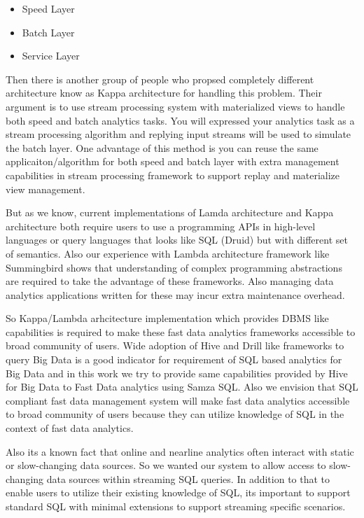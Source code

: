 \documentclass[10pt, conference, compsocconf]{IEEEtran}
\begin{document}
\begin{itemize}
 \item Speed Layer
 \item Batch Layer
 \item Service Layer
\end{itemize}

Then there is another group of people who propsed completely different architecture know as Kappa architecture for handling this problem. Their argument is to use stream processing system with materialized views to handle both speed and batch analytics tasks. You will expressed your analytics task as a stream processing algorithm and replying input streams will be used to simulate the batch layer. One advantage of this method is you can reuse the same applicaiton/algorithm for both speed and batch layer with extra management capabilities in stream processing framework to support replay and materialize view management.

But as we know, current implementations of Lamda architecture and Kappa architecture both require users to use a programming APIs in high-level languages or query languages that looks like SQL (Druid) but with different set of semantics. Also our experience with Lambda architecture framework like Summingbird shows that understanding of complex programming abstractions are required to take the advantage of these frameworks. Also managing data analytics applications written for these may incur extra maintenance overhead. 

So Kappa/Lambda arhcitecture implementation which provides DBMS like capabilities is required to make these fast data analytics frameworks accessible to broad community of users. Wide adoption of Hive and Drill like frameworks to query Big Data is a good indicator for requirement of SQL based analytics for Big Data and in this work we try to provide same capabilities provided by Hive for Big Data to Fast Data analytics using Samza SQL. Also we envision that SQL compliant fast data management system will make fast data analytics accessible to broad community of users because they can utilize knowledge of SQL in the context of fast data analytics. 

Also its a known fact that online and nearline analytics often interact with static or slow-changing data sources. So we wanted our system to allow access to slow-changing data sources within streaming SQL queries. In addition to that to enable users to utilize their existing knowledge of SQL, its important to support standard SQL with minimal extensions to support streaming specific scenarios. 
\end{document}
